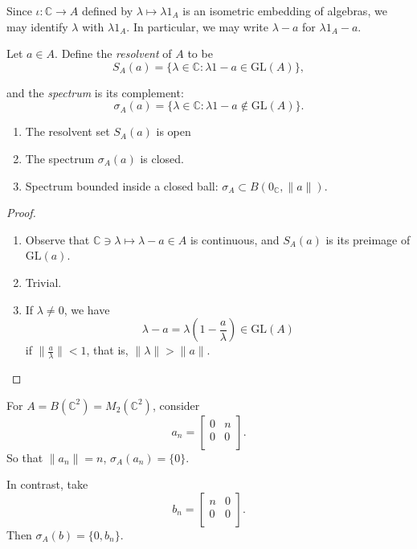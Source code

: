 \begin{notation}
	Since $\iota: \mathbb{C} \to A$ defined by $\lambda \mapsto \lambda 1_A$ is an isometric embedding of algebras, we may identify $\lambda$ with $\lambda 1_A$. In particular, we may write $\lambda - a$ for $\lambda 1_A - a$.
\end{notation}
\begin{definition}[Spectrum]
	\label{defn:Spectrum}
	Let $a \in A$. Define the \textit{resolvent} of $A$ to be
	\[
		S_A(a) = \{\lambda \in \mathbb{C}: \lambda 1 - a \in \text{GL}(A)\} 
	,\] 

	and the \textit{spectrum} is its complement:
	\[
		\sigma_A(a) = \{\lambda \in \mathbb{C}: \lambda 1 - a \not\in \text{GL}(A)\}
	.\]
\end{definition}

\begin{proposition}
	\label{prop:SpectrumClosed}
	\begin{enumerate}
		\item The resolvent set $S_A(a)$ is open
		\item The spectrum $\sigma_A(a)$ is closed.
		\item Spectrum bounded inside a closed ball: $\sigma_A \subset B(0_\mathbb{C}, \|a\|)$.
	\end{enumerate}
\end{proposition}
\begin{proof}
	\begin{enumerate}
		\item Observe that $\mathbb{C} \ni \lambda \mapsto \lambda - a \in A$ is continuous, and $S_A(a)$ is its preimage of $\text{GL}(a)$.
		\item Trivial.
		\item If $\lambda \neq 0$, we have
			\[
				\lambda - a = \lambda( 1- \frac{a}{\lambda}) \in \text{GL}(A)
			\] 
			if $\|\frac{a}{\lambda}\|< 1$, that is, $\|\lambda\| > \|a\|$.
	\end{enumerate}
\end{proof}
\begin{example}
	 For $A = B(\mathbb{C}^2) = M_2(\mathbb{C}^2)$, consider
	 \[
	 	a_n = 
		\begin{bmatrix}
			0 & n \\
			0 & 0 \\
		\end{bmatrix}
	 .\] 
	 So that $\|a_n\| = n$, $\sigma_A(a_n) = \{0\} $.

	 In contrast, take
	 \[
	 	b_n = 
		\begin{bmatrix}
			n & 0 \\
			0 & 0 \\
		\end{bmatrix}
	 .\] 
	 Then $\sigma_A(b) = \{0, b_n\} $.
\end{example}


